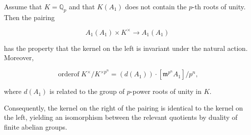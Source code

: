 Assume that $K = \mathbb{Q}_p$ and that $K(A_1)$ does not contain the $p$-th roots of unity. Then the pairing

$$A_1(A_1) \times K^\times \to A_1(A_1)$$

has the property that the kernel on the left is invariant under the natural action. Moreover,

$$\operatorname{order of } K^\times / K^{\times p^n} = (d(A_1)) \cdot [\mathfrak{m}^{p^n} A_1] / p^n,$$

where $d(A_1)$ is related to the group of $p$-power roots of unity in $K$.

Consequently, the kernel on the right of the pairing is identical to the kernel on the left, yielding an isomorphism between the relevant quotients by duality of finite abelian groups.
